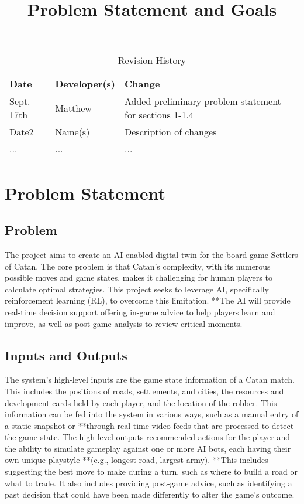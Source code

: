 \documentclass{article}
\title{Problem Statement and Goals\\\progname}
\author{\authname}
\date{}
\begin{document}
\maketitle

\begin{table}[hp]
\caption{Revision History} \label{TblRevisionHistory}
\begin{tabularx}{\textwidth}{llX}
\toprule
\textbf{Date} & \textbf{Developer(s)} & \textbf{Change}\\
\midrule
Sept. 17th & Matthew & Added preliminary problem statement for sections 1-1.4\\
Date2 & Name(s) & Description of changes\\
... & ... & ...\\
\bottomrule
\end{tabularx}
\end{table}

\section{Problem Statement}

\subsection{Problem}
The project aims to create an AI-enabled digital twin for the board game Settlers of Catan. The core problem is that Catan's complexity, with its numerous possible moves and game states, makes it challenging for human players to calculate optimal strategies. This project seeks to leverage AI, specifically reinforcement learning (RL), to overcome this limitation. **The AI will provide real-time decision support offering in-game advice to help players learn and improve, as well as post-game analysis to review critical moments.

\subsection{Inputs and Outputs}
The system's high-level inputs are the game state information of a Catan match. This includes the positions of roads, settlements, and cities, the resources and development cards held by each player, and the location of the robber. This information can be fed into the system in various ways, such as a manual entry of a static snapshot or **through real-time video feeds that are processed to detect the game state. The high-level outputs recommended actions for the player and the ability to simulate gameplay against one or more AI bots, each having their own unique playstyle **(e.g., longest road, largest army). **This includes suggesting the best move to make during a turn, such as where to build a road or what to trade. It also includes providing post-game advice, such as identifying a past decision that could have been made differently to alter the game's outcome.
\end{document}
